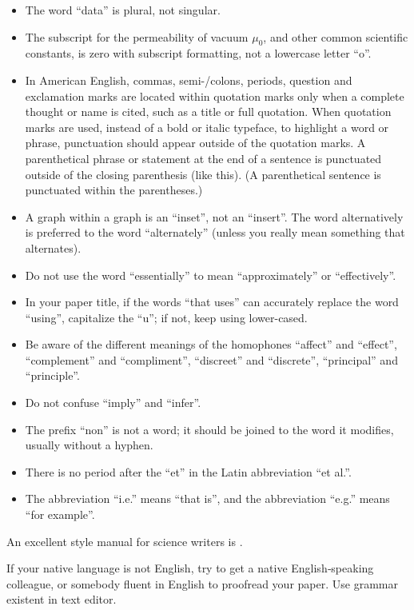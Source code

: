 \documentclass{MIPRO}
\begin{document}
\begin{itemize}
    \item The word “data” is plural, not singular.
    \item The subscript for the permeability of vacuum $\mu_0$, and other common scientific constants, is zero with subscript formatting, not a lowercase letter “o”.
    \item In American English, commas, semi-/colons, periods, question and exclamation marks are located within quotation marks only when a complete thought or name is cited, such as a title or full quotation. When quotation marks are used, instead of a bold or italic typeface, to highlight a word or phrase, punctuation should appear outside of the quotation marks. A parenthetical phrase or statement at the end of a sentence is punctuated outside of the closing parenthesis (like this). (A parenthetical sentence is punctuated within the parentheses.)
    \item A graph within a graph is an “inset”, not an “insert”. The word alternatively is preferred to the word “alternately” (unless you really mean something that alternates).
    \item Do not use the word “essentially” to mean “approximately” or “effectively”.
    \item In your paper title, if the words “that uses” can accurately replace the word “using”, capitalize the “u”; if not, keep using lower-cased.
    \item Be aware of the different meanings of the homophones “affect” and “effect”, “complement” and “compliment”, “discreet” and “discrete”, “principal” and “principle”.
    \item Do not confuse “imply” and “infer”.
    \item The prefix “non” is not a word; it should be joined to the word it modifies, usually without a hyphen.
    \item There is no period after the “et” in the Latin abbreviation “et al.”.
    \item The abbreviation “i.e.” means “that is”, and the abbreviation “e.g.” means “for example”.
\end{itemize}

An excellent style manual for science writers is \cite{young2002technical}.

If your native language is not English, try to get a native English‑speaking colleague, or somebody fluent in English to proofread your paper. Use grammar existent in text editor.
\end{document}
